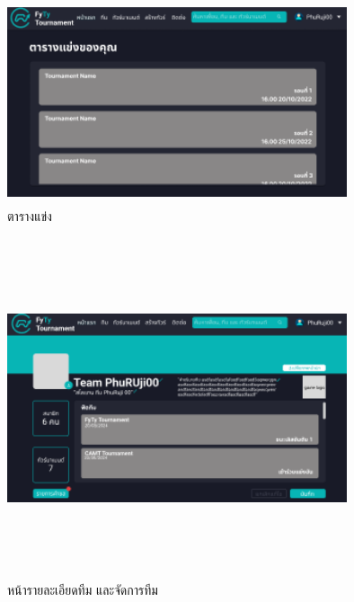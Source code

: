 \begin{figure}[h]
  \begin{center}
  \includegraphics[width=10cm,height=6cm,keepaspectratio]{schedule.png}
  \end{center}
  \caption[ตารางแข่ง]{ตารางแข่ง}
  \label{fig:ตารางแข่ง}
\end{figure}

\begin{figure}[h]
  \begin{center}
  \includegraphics[width=10cm,height=10cm,keepaspectratio]{teamDetail.png}
  \end{center}
  \caption[หน้ารายละเอียดทีม และจัดการทีม]{หน้ารายละเอียดทีม และจัดการทีม}
  \label{fig:หน้ารายละเอียดทีม และจัดการทีม}
\end{figure}

